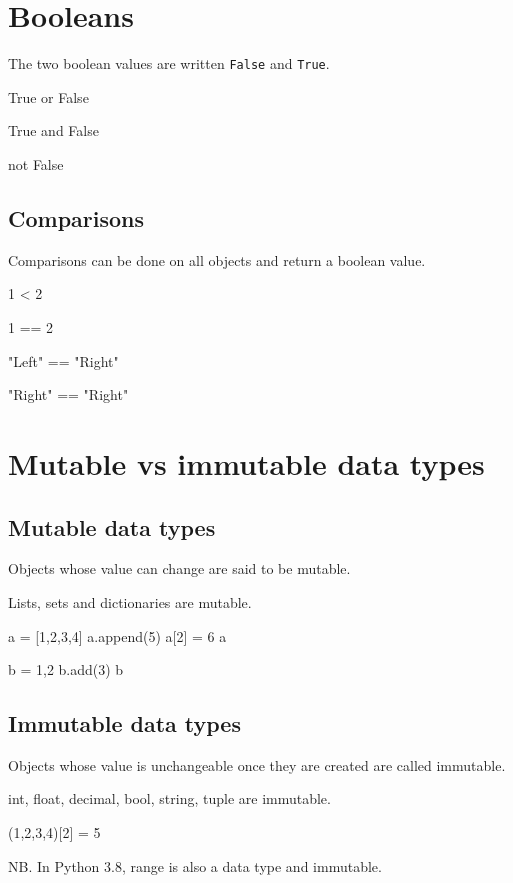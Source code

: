 \documentclass[aspectratio=1610,slidestop]{beamer}
\begin{document}
\section{Booleans}
\begin{pframe}
The two boolean values are written \texttt{False} and
\texttt{True}.
\begin{pyconsole}
True or False

True and False

not False
\end{pyconsole}
\end{pframe}


\subsection{Comparisons}
\begin{pframe}
  Comparisons can be done on all objects and return a boolean value.
\begin{pyconsole}
1 < 2

1 == 2

"Left" == "Right"

"Right" == "Right"
\end{pyconsole}
\end{pframe}


\section{Mutable vs immutable data types}
\subsection{Mutable data types}
\begin{pframe}
Objects whose value can change are said to be mutable.

Lists, sets and dictionaries are mutable.
\begin{pyconsole}
a = [1,2,3,4]
a.append(5)
a[2] = 6
a

b = {1,2}
b.add(3)
b
\end{pyconsole}
\end{pframe}

\subsection{Immutable data types}
\begin{pframe}
Objects whose value is unchangeable once they are created are called immutable.

int, float, decimal, bool, string, tuple are immutable.
\begin{pyconsole}
(1,2,3,4)[2] = 5
\end{pyconsole}
\medskip
\medskip
NB. In Python 3.8, range is also a data type and immutable.
\end{pframe}
\end{document}
